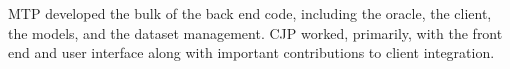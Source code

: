 \documentclass{ledger}
\begin{document}
MTP developed the bulk of the back end code, including the oracle, the client, the models, and the dataset management.
CJP worked, primarily, with the front end and user interface along with important contributions to client integration.





\pagebreak









\thispagestyle{pagelast}

\end{document}
